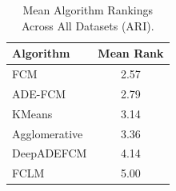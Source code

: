 \begin{table}[ht]
\centering
\caption{Mean Algorithm Rankings Across All Datasets (ARI).}
\label{tab:rankings}
\begin{tabular}{lc}
\toprule
Algorithm & Mean Rank \\
\midrule
FCM & 2.57 \\
ADE-FCM & 2.79 \\
KMeans & 3.14 \\
Agglomerative & 3.36 \\
DeepADEFCM & 4.14 \\
FCLM & 5.00 \\
\bottomrule
\end{tabular}
\end{table}
